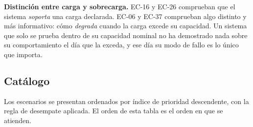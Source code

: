 \documentclass[11pt,a4paper]{article}
\begin{document}
\textbf{Distinción entre carga y sobrecarga.} EC-16 y EC-26 comprueban que el sistema \emph{soporta} una carga declarada. EC-06 y EC-37 comprueban algo distinto y más informativo: cómo \emph{degrada} cuando la carga excede su capacidad. Un sistema que solo se prueba dentro de su capacidad nominal no ha demostrado nada sobre su comportamiento el día que la exceda, y ese día su modo de fallo es lo único que importa.

\subsection{Catálogo}

Los escenarios se presentan ordenados por índice de prioridad descendente, con la regla de desempate aplicada. El orden de esta tabla es el orden en que se atienden.
\end{document}
